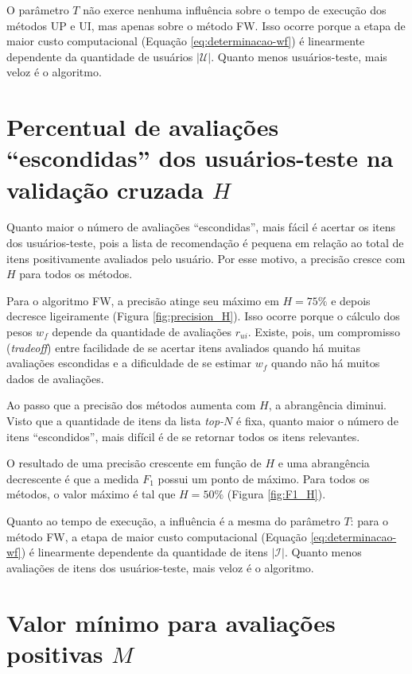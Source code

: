 O parâmetro $T$ não exerce nenhuma influência sobre o tempo de execução dos métodos UP e UI, mas apenas sobre o método FW. Isso ocorre porque a etapa de maior custo computacional (Equação \ref{eq:determinacao-wf}) é linearmente dependente da quantidade de usuários $\left|\mathcal{U}\right|$. Quanto menos usuários-teste, mais veloz é o algoritmo.



\section{Percentual de avaliações ``escondidas'' dos usuários-teste na validação cruzada $H$} %
\label{sec:percentual_de_avalia_es_dos_usu_rios_teste_na_valida_o_cruzada}

Quanto maior o número de avaliações ``escondidas'', mais fácil é acertar os itens dos usuários-teste, pois a lista de recomendação é pequena em relação ao total de itens positivamente avaliados pelo usuário. Por esse motivo, a precisão cresce com $H$ para todos os métodos. 

Para o algoritmo FW, a precisão atinge seu máximo em $H=75\%$ e depois decresce ligeiramente (Figura \ref{fig:precision_H}). Isso ocorre porque o cálculo dos pesos $w_f$ depende da quantidade de avaliações $r_{ui}$. Existe, pois, um compromisso (\textit{tradeoff}) entre facilidade de se acertar itens avaliados quando há muitas avaliações escondidas e a dificuldade de se estimar $w_f$ quando não há muitos dados de avaliações.  

Ao passo que a precisão dos métodos aumenta com $H$, a abrangência diminui. Visto que a quantidade de itens da lista \textit{top-}$N$ é fixa, quanto maior o número de itens ``escondidos'', mais difícil é de se retornar todos os itens relevantes.

O resultado de uma precisão crescente em função de $H$ e uma abrangência decrescente é que a medida $F_1$ possui um ponto de máximo. Para todos os métodos, o valor máximo é tal que $H=50\%$ (Figura \ref{fig:F1_H}).

Quanto ao tempo de execução, a influência é a mesma do parâmetro $T$: 
para o método FW, a etapa de maior custo computacional (Equação \ref{eq:determinacao-wf}) é linearmente dependente da quantidade de itens $\left|\mathcal{I}\right|$. Quanto menos avaliações de itens dos usuários-teste, mais veloz é o algoritmo.

\section{Valor mínimo para avaliações positivas $M$} %
\label{sec:valor_m_nimo_para_avalia_es_positivas_}

